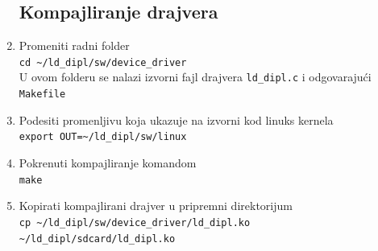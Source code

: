 \begin{enumerate}
\subsection{Kompajliranje drajvera}
\item Promeniti radni folder\\
\texttt{cd \textasciitilde/ld\_dipl/sw/device\_driver}\\
U ovom folderu se nalazi izvorni fajl drajvera \texttt{ld\_dipl.c} i odgovarajući \texttt{Makefile}
\item Podesiti promenljivu koja ukazuje na izvorni kod linuks kernela\\
\texttt{export OUT=\textasciitilde/ld\_dipl/sw/linux}
\item Pokrenuti kompajliranje komandom\\
\texttt{make}
\item Kopirati kompajlirani drajver u pripremni direktorijum\\
\texttt{cp \textasciitilde/ld\_dipl/sw/device\_driver/ld\_dipl.ko \textasciitilde/ld\_dipl/sdcard/ld\_dipl.ko }


\end{enumerate}
